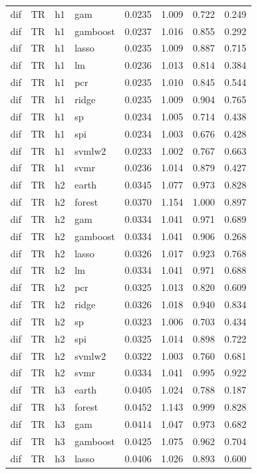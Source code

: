 \begin{ThreePartTable}
\begin{longtable}[t]{llclcccc}
dif & TR & h1 & gam & 0.0235 & 1.009 & 0.722 & 0.249\\
dif & TR & h1 & gamboost & 0.0237 & 1.016 & 0.855 & 0.292\\
dif & TR & h1 & lasso & 0.0235 & 1.009 & 0.887 & 0.715\\
dif & TR & h1 & lm & 0.0236 & 1.013 & 0.814 & 0.384\\
dif & TR & h1 & pcr & 0.0235 & 1.010 & 0.845 & 0.544\\
dif & TR & h1 & ridge & 0.0235 & 1.009 & 0.904 & 0.765\\
dif & TR & h1 & sp & 0.0234 & 1.005 & 0.714 & 0.438\\
dif & TR & h1 & spi & 0.0234 & 1.003 & 0.676 & 0.428\\
dif & TR & h1 & svmlw2 & 0.0233 & 1.002 & 0.767 & 0.663\\
dif & TR & h1 & svmr & 0.0236 & 1.014 & 0.879 & 0.427\\
\addlinespace
dif & TR & h2 & earth & 0.0345 & 1.077 & 0.973 & 0.828\\
dif & TR & h2 & forest & 0.0370 & 1.154 & 1.000 & 0.897\\
dif & TR & h2 & gam & 0.0334 & 1.041 & 0.971 & 0.689\\
dif & TR & h2 & gamboost & 0.0334 & 1.041 & 0.906 & 0.268\\
dif & TR & h2 & lasso & 0.0326 & 1.017 & 0.923 & 0.768\\
dif & TR & h2 & lm & 0.0334 & 1.041 & 0.971 & 0.688\\
dif & TR & h2 & pcr & 0.0325 & 1.013 & 0.820 & 0.609\\
dif & TR & h2 & ridge & 0.0326 & 1.018 & 0.940 & 0.834\\
dif & TR & h2 & sp & 0.0323 & 1.006 & 0.703 & 0.434\\
dif & TR & h2 & spi & 0.0325 & 1.014 & 0.898 & 0.722\\
dif & TR & h2 & svmlw2 & 0.0322 & 1.003 & 0.760 & 0.681\\
dif & TR & h2 & svmr & 0.0334 & 1.041 & 0.995 & 0.922\\
\addlinespace
dif & TR & h3 & earth & 0.0405 & 1.024 & 0.788 & 0.187\\
dif & TR & h3 & forest & 0.0452 & 1.143 & 0.999 & 0.828\\
dif & TR & h3 & gam & 0.0414 & 1.047 & 0.973 & 0.682\\
dif & TR & h3 & gamboost & 0.0425 & 1.075 & 0.962 & 0.704\\
dif & TR & h3 & lasso & 0.0406 & 1.026 & 0.893 & 0.600\\

\end{longtable}
\end{ThreePartTable}
